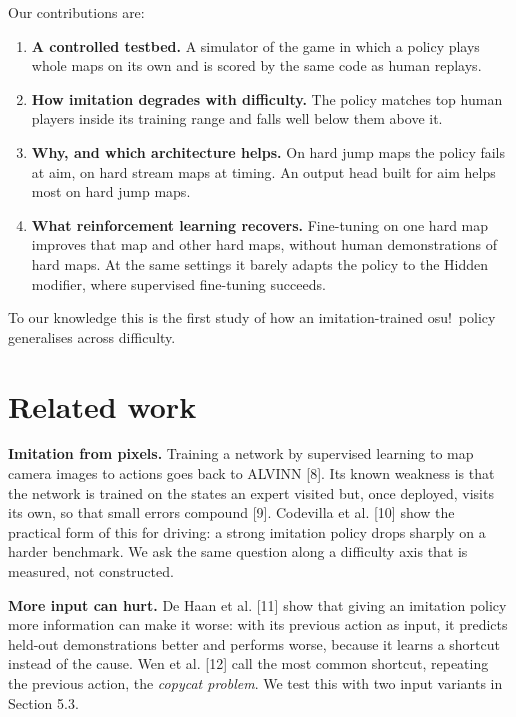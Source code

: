 \documentclass[10pt,a4paper]{article}
\begin{document}
Our contributions are:


\begin{enumerate}\setlength\itemsep{1.5pt}\setlength\parskip{0pt}\setlength\topsep{2pt}
\item \textbf{A controlled testbed.} A simulator of the game in which a policy plays whole maps on its own and is scored by the same code as human replays.
\item \textbf{How imitation degrades with difficulty.} The policy matches top human players inside its training range and falls well below them above it.
\item \textbf{Why, and which architecture helps.} On hard jump maps the policy fails at aim, on hard stream maps at timing. An output head built for aim helps most on hard jump maps.
\item \textbf{What reinforcement learning recovers.} Fine-tuning on one hard map improves that map and other hard maps, without human demonstrations of hard maps. At the same settings it barely adapts the policy to the Hidden modifier, where supervised fine-tuning succeeds.
\end{enumerate}

To our knowledge this is the first study of how an imitation-trained osu!\ policy generalises across difficulty.


\section{Related work}

\textbf{Imitation from pixels.} Training a network by supervised learning to map camera images to actions goes back to ALVINN [8]. Its known weakness is that the network is trained on the states an expert visited but, once deployed, visits its own, so that small errors compound [9]. Codevilla et al. [10] show the practical form of this for driving: a strong imitation policy drops sharply on a harder benchmark. We ask the same question along a difficulty axis that is measured, not constructed.


\textbf{More input can hurt.} De Haan et al. [11] show that giving an imitation policy more information can make it worse: with its previous action as input, it predicts held-out demonstrations better and performs worse, because it learns a shortcut instead of the cause. Wen et al. [12] call the most common shortcut, repeating the previous action, the \textit{copycat problem}. We test this with two input variants in Section 5.3.
\end{document}

